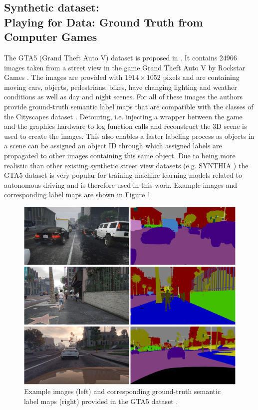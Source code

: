 \subsection{Synthetic dataset:\\
	Playing for Data: Ground Truth from Computer Games}

The GTA5 (Grand Theft Auto V) dataset is proposed in \cite{Richter_2016_ECCV}. It contains 24966 images taken from a street view in the game Grand Theft Auto V by Rockstar Games \cite{GTAV}. The images are provided with $1914 \times 1052$ pixels and are containing moving cars, objects, pedestrians, bikes, have changing lighting and weather conditions as well as day and night scenes. For all of these images the authors provide ground-truth semantic label maps that are compatible with the classes of the Cityscapes dataset \cite{Cordts_2016_CVPR}. Detouring, i.e. injecting a wrapper between the game and the graphics hardware to log function calls and reconstruct the 3D scene is used to create the images. This also enables a faster labeling process as objects in a scene can be assigned an object ID through which assigned labels are propagated to other images containing this same object. Due to being more realistic than other existing synthetic street view datasets (e.g. SYNTHIA \cite{RosCVPR16}) the GTA5 dataset is very popular for training machine learning models related to autonomous driving and is therefore used in this work. Example images and corresponding label maps are shown in Figure \ref{fig:p4d_examples} 


\begin{figure}
	\centering
	\includegraphics[width=\textwidth]{images/p4d_example.png}
	\caption{Example images (left) and corresponding ground-truth semantic label maps (right) provided in the GTA5 dataset \cite{Richter_2016_ECCV}.}
	\label{fig:p4d_examples}
\end{figure}

